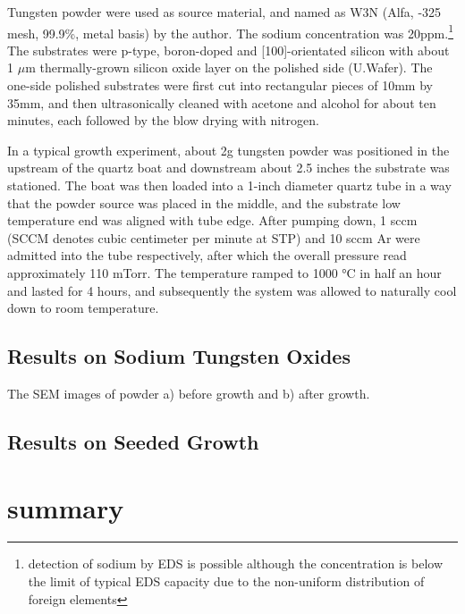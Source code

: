 Tungsten powder were used as source material, and named as W3N (Alfa, -325 mesh, 99.9\%, metal basis) by the author. The sodium concentration was 20ppm.\footnote{detection of sodium by EDS is possible although the concentration is below the limit of typical EDS capacity due to the non-uniform distribution of foreign elements} The substrates were p-type, boron-doped and [100]-orientated silicon with about 1 $\mu$m thermally-grown silicon oxide layer on the polished side (U.Wafer). The one-side polished substrates were first cut into rectangular pieces of 10mm by 35mm, and then ultrasonically cleaned with acetone and alcohol for about ten minutes, each followed by the blow drying with nitrogen.

In a typical growth experiment, about 2g tungsten powder was positioned in the upstream of the quartz boat and downstream about 2.5 inches the substrate was stationed. The boat was then loaded into a 1-inch diameter quartz tube in a way that the powder source was placed in the middle, and the substrate low temperature end was aligned with tube edge. After pumping down, 1 \gls{sccm} (SCCM denotes cubic centimeter per minute at STP)  and 10 sccm Ar were admitted into the tube respectively, after which the overall pressure read approximately 110 mTorr. The temperature ramped to 1000 \si{\degreeCelsius} in half an hour and lasted for 4 hours, and subsequently the system was allowed to naturally cool down to room temperature.

\subsection{Results on Sodium Tungsten Oxides}


The SEM images of powder a) before growth and b) after growth.

\subsection{Results on Seeded Growth}

\section{summary}

